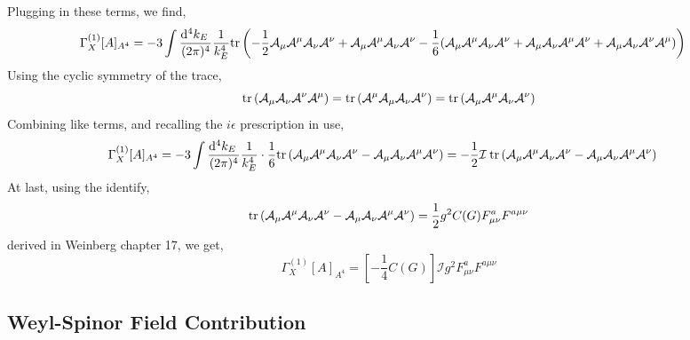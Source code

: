 \documentclass[12pt]{article}
\begin{document}
Plugging in these terms, we find,
\begin{align*}
\Gamma^{(1)}_X[A]_{A^4} & = - 3 \int \frac{\dn{4}{k_E}}{(2 \pi)^4} \frac{1}{k_E^4} \tr{ - \frac{1}{2} \A_\mu \A^\mu \A_\nu \A^\nu + \A_\mu \A^\mu \A_\nu \A^\nu - \frac{1}{6} ( \A_\mu \A^\mu \A_\nu \A^\nu + \A_\mu \A_\nu \A^\mu \A^\nu + \A_\mu \A_\nu \A^{\nu} \A^{\mu} ) } 
\end{align*}
Using the cyclic symmetry of the trace,
\[ \tr{\A_\mu \A_\nu \A^{\nu} \A^{\mu}} = \tr{\A^{\mu} \A_\mu \A_\nu \A^{\nu}} = \tr{\A_\mu \A^\mu \A_\nu \A^\nu} \]
Combining like terms, and recalling the $i \epsilon$ prescription in use,
\begin{align*}
\Gamma^{(1)}_X[A]_{A^4} & = - 3 \int \frac{\dn{4}{k_E}}{(2 \pi)^4} \frac{1}{k_E^4} \cdot \frac{1}{6} \tr{ \A_\mu \A^\mu \A_\nu \A^\nu  - \A_\mu \A_\nu \A^\mu \A^\nu} = - \frac{1}{2} \mathcal{I} \: \tr{ \A_\mu \A^\mu \A_\nu \A^\nu  - \A_\mu \A_\nu \A^\mu \A^\nu}
\end{align*}
At last, using the identify, 
\[ \tr{ \A_\mu \A^\mu \A_\nu \A^\nu  - \A_\mu \A_\nu \A^\mu \A^\nu} = \frac{1}{2} g^2 C(G) F_{\mu \nu}^a F^{a \mu \nu} \]
derived in Weinberg chapter 17, we get,
\[ \Gamma^{(1)}_X[A]_{A^4} = \left[ - \frac{1}{4} C(G) \right] \mathcal{I} g^2 F_{\mu \nu}^a F^{a \mu \nu} \]

\subsection{Weyl-Spinor Field Contribution}
\end{document}
